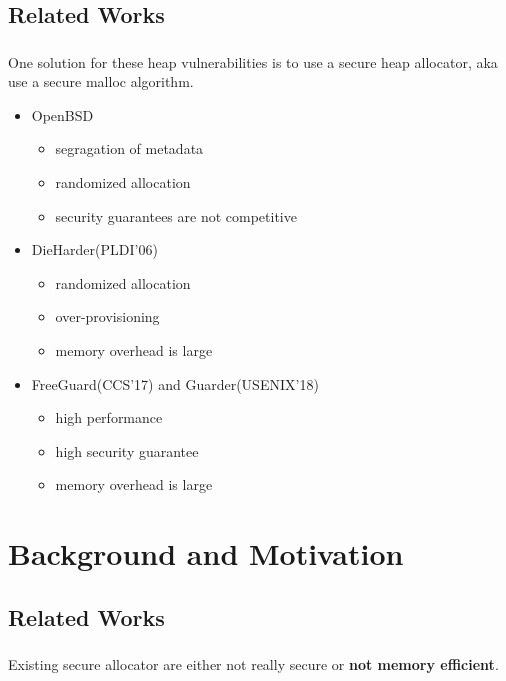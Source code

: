 \documentclass{beamer}
\begin{document}
\subsection{Related Works}
\begin{frame}
  \frametitle{\secname}
  \framesubtitle{\subsecname}

    One solution for these heap vulnerabilities is to use a secure heap
    allocator, aka use a secure malloc algorithm.\\
  \begin{itemize}
    \item OpenBSD
      \begin{itemize}
        \item segragation of metadata
        \item randomized allocation
        \item security guarantees are not competitive
      \end{itemize}
  \item DieHarder(PLDI'06)
      \begin{itemize}
          \item randomized allocation
          \item over-provisioning
          \item memory overhead is large
      \end{itemize}
  \item FreeGuard(CCS'17) and Guarder(USENIX'18)
      \begin{itemize}
        \item high performance
        \item high security guarantee
        \item memory overhead is large
      \end{itemize}
  \end{itemize}
\end{frame}

\section{Background and Motivation}
\subsection{Related Works}
\begin{frame}
  \frametitle{\secname}
  \framesubtitle{\subsecname}

  Existing secure allocator are either not really secure or \textbf{not memory
efficient}.

\end{frame}
\end{document}
